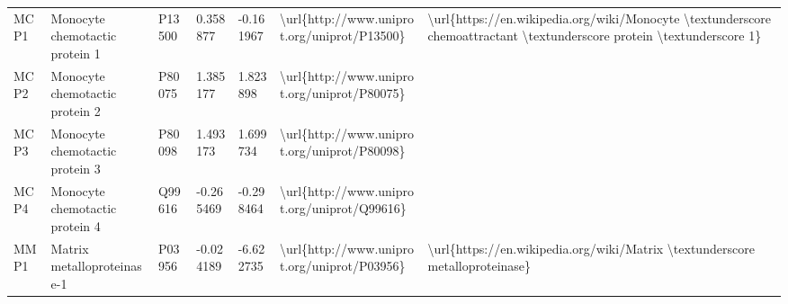 \begin{table}[]
\begin{tabular}{lllllll}
\multicolumn{1}{l|}{MCP1}     & Monocyte chemotactic protein 1                                & P13500  & 0.358877           & -0.161967         & \textbackslash{}url\{http://www.uniprot.org/uniprot/P13500\} & \textbackslash{}url\{https://en.wikipedia.org/wiki/Monocyte \textbackslash{}textunderscore chemoattractant \textbackslash{}textunderscore protein \textbackslash{}textunderscore 1\}                                                                                                               \\
\multicolumn{1}{l|}{MCP2}     & Monocyte chemotactic protein 2                                & P80075  & 1.385177           & 1.823898          & \textbackslash{}url\{http://www.uniprot.org/uniprot/P80075\} &                                                                                                                                                                                                                                                                                                    \\
\multicolumn{1}{l|}{MCP3}     & Monocyte chemotactic protein 3                                & P80098  & 1.493173           & 1.699734          & \textbackslash{}url\{http://www.uniprot.org/uniprot/P80098\} &                                                                                                                                                                                                                                                                                                    \\
\multicolumn{1}{l|}{MCP4}     & Monocyte chemotactic protein 4                                & Q99616  & -0.265469          & -0.298464         & \textbackslash{}url\{http://www.uniprot.org/uniprot/Q99616\} &                                                                                                                                                                                                                                                                                                    \\
\multicolumn{1}{l|}{MMP1}     & Matrix metalloproteinase-1                                    & P03956  & -0.024189          & -6.622735         & \textbackslash{}url\{http://www.uniprot.org/uniprot/P03956\} & \textbackslash{}url\{https://en.wikipedia.org/wiki/Matrix \textbackslash{}textunderscore metalloproteinase\}                                                                                                                                                                                       \\

\end{tabular}
\end{table}
